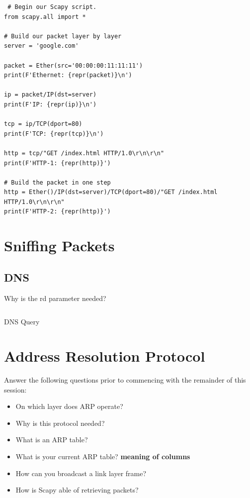 \documentclass[11pt,a4paper]{article}
\begin{document}
 \begin{verbatim}
 # Begin our Scapy script.
from scapy.all import *

# Build our packet layer by layer
server = 'google.com'

packet = Ether(src='00:00:00:11:11:11')
print(F'Ethernet: {repr(packet)}\n')

ip = packet/IP(dst=server)
print(F'IP: {repr(ip)}\n')

tcp = ip/TCP(dport=80)
print(F'TCP: {repr(tcp)}\n')

http = tcp/"GET /index.html HTTP/1.0\r\n\r\n"
print(F'HTTP-1: {repr(http)}')

# Build the packet in one step
http = Ether()/IP(dst=server)/TCP(dport=80)/"GET /index.html HTTP/1.0\r\n\r\n"
print(F'HTTP-2: {repr(http)}')
\end{verbatim}

\section{Sniffing Packets}


\subsection{DNS}


Why is the rd parameter needed?

\begin{listing}[h]
\inputminted[firstline=16]{python}{../code_students/dns_query.py}
\caption{DNS Query}%
\label{listing:dns-query}
\end{listing}


\section{Address Resolution Protocol}
Answer the following questions prior to commencing with the remainder of this session:
\begin{itemize}
    \item On which layer does ARP operate?
    \item Why is this protocol needed?
    \item What is an ARP table?
    \item What is your current ARP table? \textbf{meaning of columns}
    \item How can you broadcast a link layer frame?
    \item How is Scapy able of retrieving packets?
\end{itemize}
\end{document}
